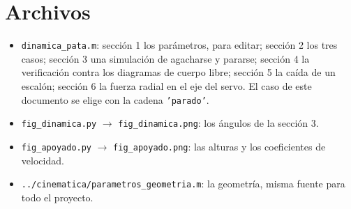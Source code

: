 \documentclass[11pt,a4paper]{article}
\begin{document}
\section{Archivos}

\begin{itemize}
\item \texttt{dinamica\_pata.m}: sección 1 los parámetros, para editar; sección 2 los tres casos; sección 3 una
  simulación de agacharse y pararse; sección 4 la verificación contra los diagramas de cuerpo libre; sección 5
  la caída de un escalón; sección 6 la fuerza radial en el eje del servo. El caso de este documento se elige con la cadena \texttt{'parado'}.
\item \texttt{fig\_dinamica.py} \(\to\) \texttt{fig\_dinamica.png}: los ángulos de la sección 3.
\item \texttt{fig\_apoyado.py} \(\to\) \texttt{fig\_apoyado.png}: las alturas y los coeficientes de velocidad.
\item \texttt{../cinematica/parametros\_geometria.m}: la geometría, misma fuente para todo el proyecto.
\end{itemize}
\end{document}
